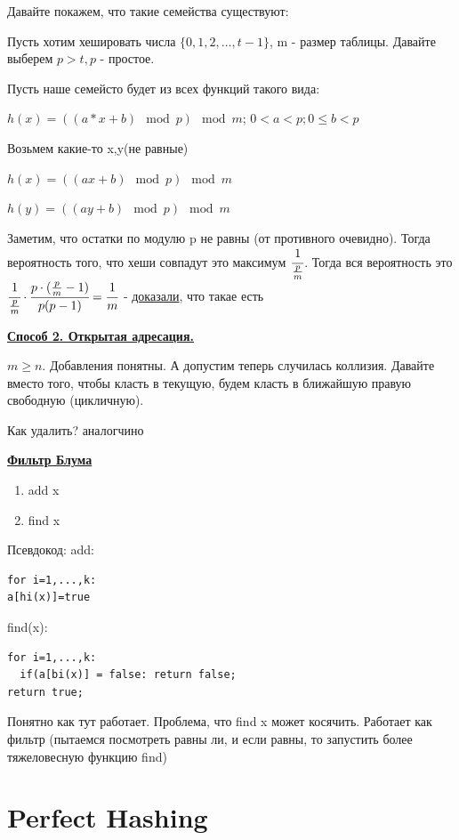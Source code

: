 \documentclass{article}
\newcommand{\deff}[1]{\underline{\textbf{#1}}}
\begin{document}
Давайте покажем, что такие семейства существуют:

Пусть хотим хешировать числа $\{0,1,2,\ldots,t-1\}$, m - размер таблицы. Давайте выберем $p>t,p$ - простое. 

Пусть наше семейсто будет из всех функций такого вида:

$h(x) = ((a*x+b)\mod p)\mod m$; $0<a<p;0\leq b < p$

Возьмем какие-то x,y(не равные)

$h(x) = ((ax+b) \mod p) \mod m$

$h(y) = ((ay+b) \mod p) \mod m$

Заметим, что остатки по модулю p не равны (от противного очевидно). Тогда вероятность того, что хеши совпадут это максимум $\cfrac{1}{\frac{p}{m}}$. Тогда вся вероятность это $\cfrac{1}{\frac{p}{m}}\cdot \cfrac{p \cdot (\frac{p}{m}-1)}{p (p-1)} = \cfrac{1}{m}$  - \uline{доказали}, что такае есть

\deff{Способ 2. Открытая адресация.}

$m\geq n$. Добавления понятны. А допустим теперь случилась коллизия. Давайте вместо того, чтобы класть в текущую, будем класть в  ближайшую правую свободную (цикличную). 

Как удалить? аналогчино

\deff{Фильтр Блума}

\begin{enumerate}
    \item add x
    \item find x
\end{enumerate}

Псевдокод:
add:
\begin{lstlisting}[mathescape]
for i=1,...,k:
a[hi(x)]=true
\end{lstlisting}

find(x):
\begin{lstlisting}[mathescape]
for i=1,...,k:
  if(a[bi(x)] = false: return false;
return true;
\end{lstlisting}

Понятно как тут работает. Проблема, что find x может косячить. Работает как фильтр (пытаемся посмотреть равны ли, и если равны, то запустить более тяжеловесную функцию find)

\pagebreak

\section{Perfect Hashing}
\end{document}
